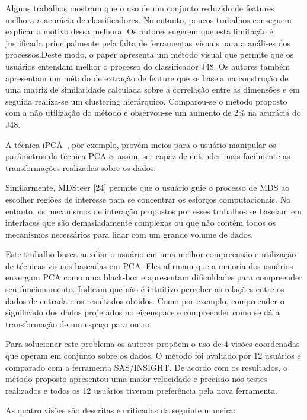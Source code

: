 Alguns trabalhos mostram que o uso de um conjunto reduzido de features melhora a acurácia de classificadores. No entanto, poucos trabalhos conseguem explicar o motivo dessa melhora. Os autores sugerem que esta limitação é justificada principalmente pela falta de ferramentas visuais para a análises dos processos.Deste modo, o paper apresenta um método visual que permite que os usuários entendam melhor o processo do classificador J48. Os autores também apresentam um método de extração de feature que se baseia na construção de uma matriz de similaridade calculada sobre a correlação entre as dimensões e em seguida realiza-se um clustering hierárquico. Comparou-se o método proposto com a não utilização do método e observou-se um aumento de 2\% na acurácia do J48.

A técnica iPCA~\cite{Jeong2009}, por exemplo, provém meios para o usuário manipular os parâmetros da técnica PCA e, assim, ser capaz de entender mais facilmente as transformações realizadas sobre os dados. 

Similarmente, MDSteer [24] permite que o usuário guie o processo de MDS ao escolher regiões de interesse para se concentrar os esforços computacionais. No entanto, os mecanismos de interação propostos por esses trabalhos se baseiam em interfaces que são demasiadamente complexas ou que não contém todos os mecanismos necessários para lidar com um grande volume de dados.

Este trabalho busca auxiliar o usuário em uma melhor compreensão e utilização de técnicas visuais baseadas em PCA.   Eles afirmam que a maioria dos usuários enxergam PCA como uma black-box e apresentam dificuldades para compreender seu funcionamento. Indicam que não é intuitivo perceber as relações entre os dados de entrada e os resultados obtidos. Como por exemplo, compreender o significado dos dados projetados no eigenspace e compreender como se dá a transformação de um espaço para outro.

Para solucionar este problema os autores propõem o uso de 4 visões coordenadas que operam em conjunto sobre os dados. O método foi avaliado por 12 usuários e comparado com a ferramenta SAS/INSIGHT. De acordo com os resultados, o método proposto apresentou uma maior velocidade e precisão nos testes realizados e todos os 12 usuários tiveram preferência pela nova ferramenta.

As quatro visões são descritas e criticadas da seguinte maneira:

